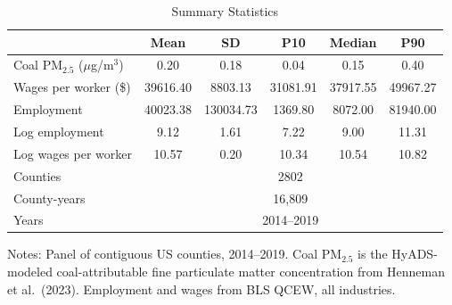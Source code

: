 \begin{table}[t]
\centering
\caption{Summary Statistics}
\label{tab:summary}
\begin{tabular}{lccccc}
\hline\hline
 & Mean & SD & P10 & Median & P90 \\
\hline
Coal PM$_{2.5}$ ($\mu$g/m$^3$) & 0.20 & 0.18 & 0.04 & 0.15 & 0.40 \\
Wages per worker (\$) & 39616.40 & 8803.13 & 31081.91 & 37917.55 & 49967.27 \\
Employment & 40023.38 & 130034.73 & 1369.80 & 8072.00 & 81940.00 \\
Log employment & 9.12 & 1.61 & 7.22 & 9.00 & 11.31 \\
Log wages per worker & 10.57 & 0.20 & 10.34 & 10.54 & 10.82 \\
\hline
Counties & \multicolumn{5}{c}{2802} \\
County-years & \multicolumn{5}{c}{16,809} \\
Years & \multicolumn{5}{c}{2014--2019} \\
\hline\hline
\end{tabular}
\begin{flushleft}\small
Notes: Panel of contiguous US counties, 2014--2019. Coal PM$_{2.5}$ is the HyADS-modeled coal-attributable fine particulate matter concentration from Henneman et al.\ (2023). Employment and wages from BLS QCEW, all industries.
\end{flushleft}
\end{table}
